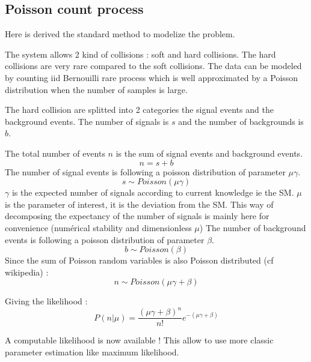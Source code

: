 \subsection{Poisson count process} %
\label{sub:poisson_count_process}

Here is derived the standard method to modelize the problem.

The system allows 2 kind of collisions : soft and hard collisions.
The hard collisions are very rare compared to the soft collisions.
The data can be modeled by counting iid Bernouilli rare process which is well approximated by a Poisson distribution \needcite when the number of samples is large.


The hard collision are splitted into 2 categories the signal events and the background events.
The number of signals is $s$ and the number of backgrounds is $b$.

The total number of events $n$ is the sum of signal events and background events.
\begin{equation}
	n = s + b
\end{equation}
The number of signal events is following a poisson distribution of parameter $\mu \gamma$.
\begin{equation}
	s \sim Poisson(\mu \gamma)
\end{equation}
$\gamma$ is the expected number of signals according to current knowledge ie the SM.
$\mu$ is the parameter of interest, it is the deviation from the SM.
This way of decomposing the expectancy of the number of signals is mainly here for convenience (numérical stability and dimensionless $\mu$)
The number of background events is following a poisson distribution of parameter $\beta$.
\begin{equation}
	b \sim Poisson(\beta)
\end{equation}
Since the sum of Poisson random variables is also Poisson distributed \needcite (cf wikipedia) :
\begin{equation}
	n \sim Poisson(\mu \gamma + \beta)
\end{equation}

Giving the likelihood :
\begin{equation}
	P(n| \mu) = \frac{(\mu \gamma +\beta)^n }{n!} e^{-(\mu \gamma +\beta)}
\end{equation}

A computable likelihood is now available !
This allow to use more classic parameter estimation like maximum likelihood.

